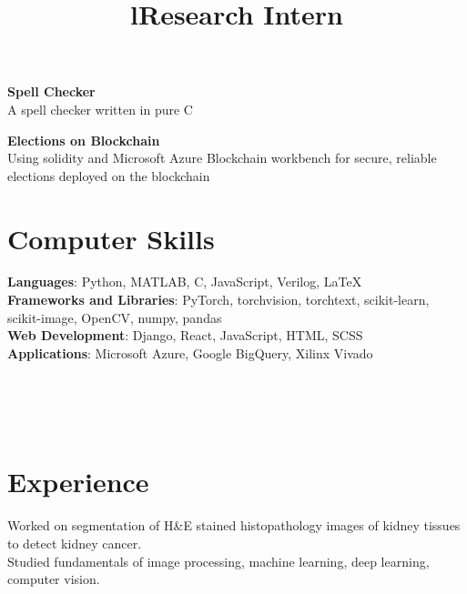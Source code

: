 \documentclass[margin]{res}
\begin{document}
\begin{resume}
      \par
      \textbf{Spell Checker}\\
      A spell checker written in pure C

      \par
      \textbf{Elections on Blockchain}\\
      Using solidity and Microsoft Azure Blockchain workbench for secure, reliable elections deployed on the blockchain

    \section{Computer Skills}
      \textbf{Languages}: Python, MATLAB, C, JavaScript, Verilog, \LaTeX
      \\
      \textbf{Frameworks and Libraries}: PyTorch, torchvision, torchtext, scikit-learn, scikit-image, OpenCV, numpy, pandas
      \\
      \textbf{Web Development}: Django, React, JavaScript, HTML, SCSS
      \\
      \textbf{Applications}: Microsoft Azure, Google BigQuery, Xilinx Vivado


    \begin{format}
      \title{l}\\
      \\
      \body\\
    \end{format}

    \section{Experience}
      \title{\textbf{Research Intern}}
      \begin{position}
        Worked on segmentation of H\&E stained histopathology images of kidney tissues to detect kidney cancer.\\
        Studied fundamentals of image processing, machine learning, deep learning, computer vision.
      \end{position}


\end{resume}
\end{document}
